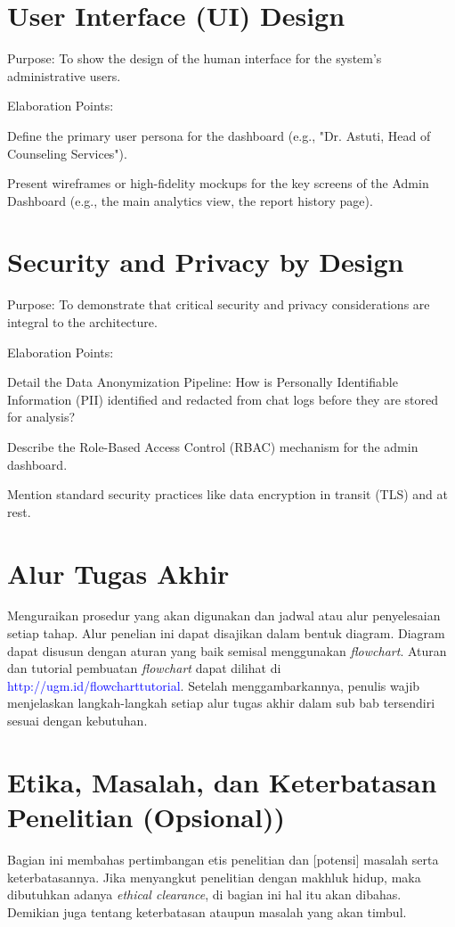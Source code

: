 \section{User Interface (UI) Design}
Purpose: To show the design of the human interface for the system's administrative users.

Elaboration Points:

Define the primary user persona for the dashboard (e.g., "Dr. Astuti, Head of Counseling Services").

Present wireframes or high-fidelity mockups for the key screens of the Admin Dashboard (e.g., the main analytics view, the report history page).

\section{Security and Privacy by Design}
Purpose: To demonstrate that critical security and privacy considerations are integral to the architecture.

Elaboration Points:

Detail the Data Anonymization Pipeline: How is Personally Identifiable Information (PII) identified and redacted from chat logs before they are stored for analysis?

Describe the Role-Based Access Control (RBAC) mechanism for the admin dashboard.

Mention standard security practices like data encryption in transit (TLS) and at rest.

\section{Alur Tugas Akhir}

Menguraikan prosedur yang akan digunakan dan jadwal atau alur penyelesaian setiap 
tahap. Alur penelian ini dapat disajikan dalam bentuk diagram. Diagram dapat disusun dengan aturan yang baik semisal menggunakan \textit{flowchart}. Aturan dan tutorial pembuatan \textit{flowchart} dapat dilihat di \textcolor{blue}{http://ugm.id/flowcharttutorial}. Setelah menggambarkannya, penulis wajib menjelaskan langkah-langkah setiap alur tugas akhir dalam sub bab tersendiri sesuai dengan kebutuhan.

\section{Etika, Masalah, dan Keterbatasan Penelitian (Opsional))}

Bagian ini membahas pertimbangan etis penelitian dan [potensi] masalah serta
keterbatasannya. Jika menyangkut penelitian dengan makhluk hidup, maka dibutuhkan adanya \textit{ethical clearance}, di bagian ini hal itu akan dibahas. Demikian juga tentang keterbatasan ataupun masalah yang akan timbul.
